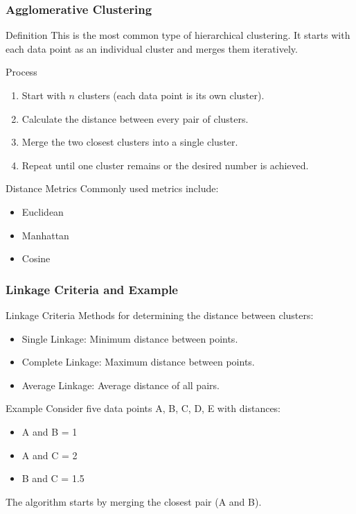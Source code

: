 \documentclass{beamer}
\begin{document}
\begin{frame}[fragile]
    \frametitle{Agglomerative Clustering}
    \begin{block}{Definition}
        This is the most common type of hierarchical clustering. It starts with each data point as an individual cluster and merges them iteratively.
    \end{block}
    
    \begin{block}{Process}
        \begin{enumerate}
            \item Start with $n$ clusters (each data point is its own cluster).
            \item Calculate the distance between every pair of clusters.
            \item Merge the two closest clusters into a single cluster.
            \item Repeat until one cluster remains or the desired number is achieved.
        \end{enumerate}
    \end{block}
    
    \begin{block}{Distance Metrics}
        Commonly used metrics include:
        \begin{itemize}
            \item Euclidean
            \item Manhattan
            \item Cosine
        \end{itemize}
    \end{block}
\end{frame}

\begin{frame}[fragile]
    \frametitle{Linkage Criteria and Example}
    \begin{block}{Linkage Criteria}
        Methods for determining the distance between clusters:
        \begin{itemize}
            \item Single Linkage: Minimum distance between points.
            \item Complete Linkage: Maximum distance between points.
            \item Average Linkage: Average distance of all pairs.
        \end{itemize}
    \end{block}
    
    \begin{block}{Example}
    Consider five data points A, B, C, D, E with distances:
    \begin{itemize}
        \item A and B = 1
        \item A and C = 2
        \item B and C = 1.5
    \end{itemize}
    The algorithm starts by merging the closest pair (A and B).
    \end{block}
\end{frame}
\end{document}

